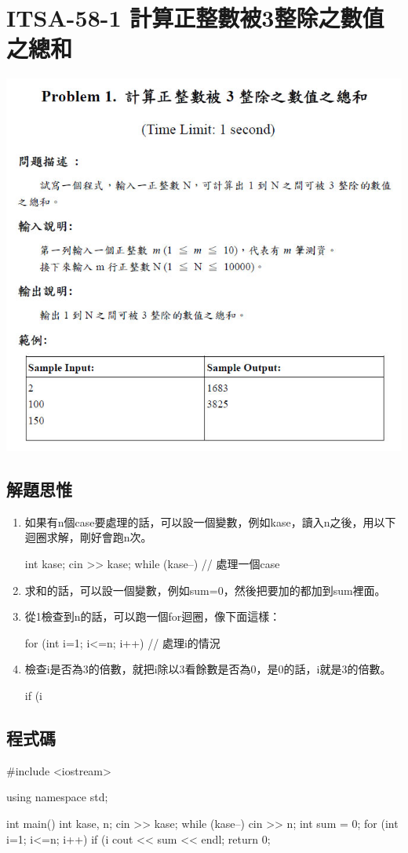 \section{ITSA-58-1 計算正整數被3整除之數值之總和}
\centerline{\includegraphics[width=.8\textwidth]{../solutions/fig/58ITSA1}}
\subsection{解題思惟}
\begin{enumerate}
	\item 如果有n個case要處理的話，可以設一個變數，例如kase，讀入n之後，用以下迴圈求解，剛好會跑n次。
	\begin{inside}
		int kase; cin >> kase;
		while (kase--) {
			// 處理一個case
		}
	\end{inside}
	\item 求和的話，可以設一個變數，例如sum=0，然後把要加的都加到sum裡面。
	\item 從1檢查到n的話，可以跑一個for迴圈，像下面這樣：
	\begin{inside}
		for (int i=1; i<=n; i++) {
			// 處理i的情況
		}
	\end{inside}
	\item 檢查i是否為3的倍數，就把i除以3看餘數是否為0，是0的話，i就是3的倍數。
	\begin{inside}
		if (i%
	\end{inside}
\end{enumerate}
\subsection{程式碼}
\begin{cppcode}
#include <iostream>

using namespace std;

int main()
{
	int kase, n; cin >> kase;
	while (kase--) {
		cin >> n;
		int sum = 0;
		for (int i=1; i<=n; i++) {
			if (i%
		}
		cout << sum << endl;
	}
	return 0;
}
\end{cppcode}
